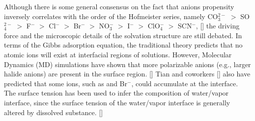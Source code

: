 Although there is some general consensus on the fact that anions propensity inversely correlates with
the order of the Hofmeister series, namely 
CO$_3^{2-}$ $>$  SO$_4^{2-}$ $>$ F$^-$ $>$ Cl$^-$ $>$ Br$^-$ $>$ NO$_3^-$ $>$ I$^-$ $>$ ClO$_4^-$ $>$ SCN$^-$, [\cite{PJ06,ZYJ10,DT08,DFP11}]
the driving force and the microscopic details of the solvation structure are still debated. 
In terms of the Gibbs adsorption equation, the traditional theory predicts that 
no atomic ions will exist at interfacial regions of solutions. However, 
Molecular Dynamics (MD) simulations have shown that more polarizable anions (e.g., larger halide anions) are present in the surface region. [\cite{PJ01,PJ02}] 
Tian and coworkers [\cite{CST11}] also have predicted that some ions, such as \I and Br$^{-}$, could accumulate at the interface.
The surface tension has been used to infer the composition of water/vapor interface, 
since the surface tension of the water/vapor interface is generally altered by dissolved substance. [\cite{PJ02}]


